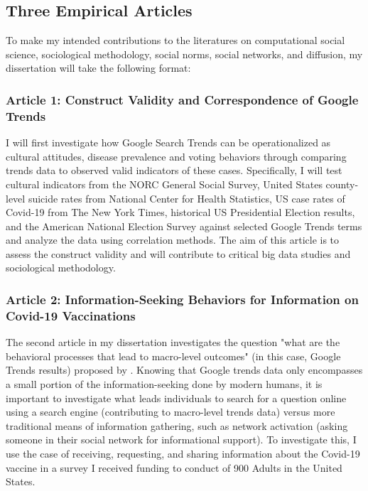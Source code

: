 \subsection{Three Empirical Articles}

To make my intended contributions to the literatures on computational
social science, sociological methodology, social norms, social networks,
and diffusion, my dissertation will take the following format:

\subsubsection{Article 1: Construct Validity and Correspondence of Google Trends}
I will first investigate how Google Search Trends can be operationalized
as cultural attitudes, disease prevalence and voting behaviors through
comparing trends data to observed valid indicators of these cases.
Specifically, I will test cultural indicators from the NORC General
Social Survey, United States county-level suicide rates from National
Center for Health Statistics, US case rates of Covid-19 from The New
York Times, historical US Presidential Election results, and the
American National Election Survey against selected Google Trends terms
and analyze the data using correlation methods. The aim of this article
is to assess the construct validity and will contribute to critical big
data studies and sociological methodology.

\subsubsection{Article 2: Information-Seeking Behaviors for Information on Covid-19 Vaccinations}
The second article in my dissertation investigates the question "what
are the behavioral processes that lead to macro-level outcomes" (in this
case, Google Trends results) proposed by \citet{breigerScaling2015}. Knowing that
Google trends data only encompasses a small portion of the
information-seeking done by modern humans, it is important to
investigate what leads individuals to search for a question online using
a search engine (contributing to macro-level trends data) versus more
traditional means of information gathering, such as network activation
(asking someone in their social network for informational support). To
investigate this, I use the case of receiving, requesting, and sharing
information about the Covid-19 vaccine in a survey I received funding to
conduct of 900 Adults in the United States.

